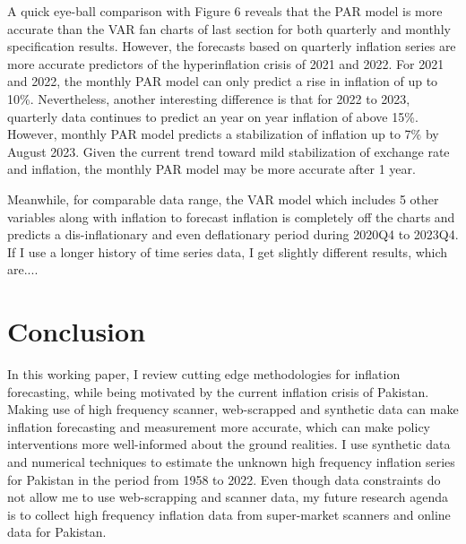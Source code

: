 \documentclass[12pt]{article}
\newcommand{\1}{\mathbbm 1}
\begin{document}
		A quick eye-ball comparison with Figure 6 reveals that the PAR model is more accurate than the VAR fan charts of last section for both quarterly and monthly specification results. However, the forecasts based on quarterly inflation series are more accurate predictors of the hyperinflation crisis of 2021 and 2022. For 2021 and 2022, the monthly PAR model can only predict a rise in inflation of up to 10\%. Nevertheless, another interesting difference is that for 2022 to 2023, quarterly data continues to predict an year on year inflation of above 15\%. However, monthly PAR model predicts a stabilization of inflation up to 7\% by August 2023. Given the current trend toward mild stabilization of exchange rate and inflation, the monthly PAR model may be more accurate after 1 year.
		
		Meanwhile, for comparable data range, the VAR model which includes 5 other variables along with inflation to forecast inflation is completely off the charts and predicts a dis-inflationary and even deflationary period during 2020Q4 to 2023Q4. If I use a longer history of time series data, I get slightly different results, which are....
		
		
		
		
		
		
		
		
		
		
		
		
		
		
		
		
		
		
		
		
		
	
		
		
		
		\section{Conclusion}
		
		In this working paper, I review cutting edge methodologies for inflation forecasting, while being motivated by the current inflation crisis of Pakistan. Making use of high frequency scanner, web-scrapped and synthetic data can make inflation forecasting and measurement more accurate, which can make policy interventions more well-informed about the ground realities. I use synthetic data and numerical techniques to estimate the unknown high frequency inflation series for Pakistan in the period from 1958 to 2022. Even though data constraints do not allow me to use web-scrapping and scanner data, my future research agenda is to collect high frequency inflation data from super-market scanners and online data for Pakistan. 
		
\end{document}
